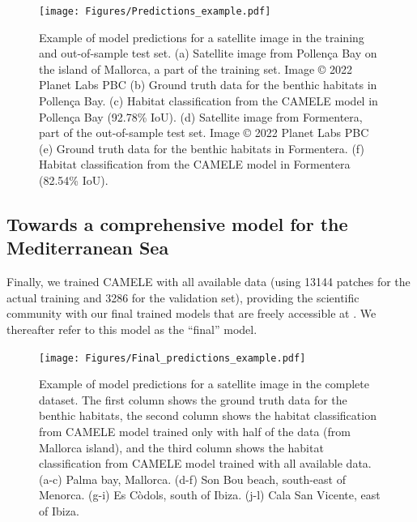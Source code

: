 \begin{figure}[H]
    \centering
    \texttt{[image: Figures/Predictions\_example.pdf]}
    \caption[Example of model predictions for a satellite image in the training
        and out-of-sample test set]{Example of model predictions for a
        satellite
        image in the training
        and out-of-sample test set. (a) Satellite image from Pollença Bay on
        the island of Mallorca, a part of the training set. Image © 2022 Planet
        Labs PBC (b) Ground truth data for the benthic habitats in Pollença
        Bay. (c) Habitat classification from the CAMELE model in Pollença Bay
        (92.78\% IoU). (d) Satellite image from Formentera, part of the
        out-of-sample test set. Image © 2022 Planet Labs PBC (e) Ground truth
        data for the benthic habitats in Formentera. (f) Habitat classification
        from the CAMELE model in Formentera (82.54\% IoU).}
    \label{fig:example_prediction}
\end{figure}

\subsection{Towards a comprehensive model for the Mediterranean Sea}

Finally, we trained CAMELE with all available data (using 13144 patches for the
actual training and 3286 for the validation set), providing the scientific
community with our final trained models that are freely accessible at
\cite{GimenezRomero_zenodo}. We thereafter refer to this model as the ``final''
model.

\begin{figure}[H]
    \centering
    \texttt{[image: Figures/Final\_predictions\_example.pdf]}
    \caption[Example of model predictions for a satellite image in the complete
        dataset]{Example of model predictions for a satellite image in the
        complete
        dataset. The first column shows the ground truth data for the benthic
        habitats, the second column shows the habitat classification from
        CAMELE model trained only with half of the data (from Mallorca island),
        and the third column shows the habitat classification from CAMELE model
        trained with all available data. (a-c) Palma bay, Mallorca. (d-f) Son
        Bou beach, south-east of Menorca. (g-i) Es Còdols, south of Ibiza.
        (j-l) Cala San Vicente, east of Ibiza.}
    \label{fig:model_performance_complete}
\end{figure}

